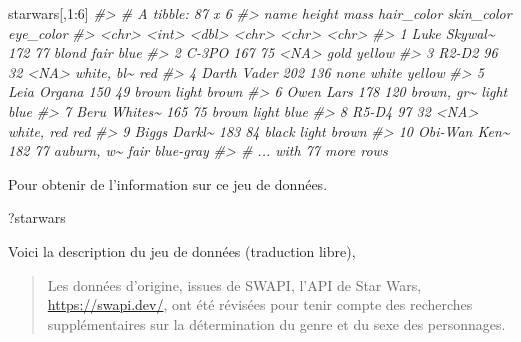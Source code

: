 \documentclass[
]{book}
\newenvironment{Shaded}{}{}
\newcommand{\CommentTok}[1]{\textit{#1}}
\newcommand{\DecValTok}[1]{#1}
\newcommand{\NormalTok}[1]{#1}
\newcommand{\SpecialCharTok}[1]{#1}
\begin{document}
\begin{Shaded}
\begin{Highlighting}[]
\NormalTok{starwars[,}\DecValTok{1}\SpecialCharTok{:}\DecValTok{6}\NormalTok{]}
\CommentTok{\#\textgreater{} \# A tibble: 87 x 6}
\CommentTok{\#\textgreater{}    name         height  mass hair\_color skin\_color eye\_color}
\CommentTok{\#\textgreater{}    \textless{}chr\textgreater{}         \textless{}int\textgreater{} \textless{}dbl\textgreater{} \textless{}chr\textgreater{}      \textless{}chr\textgreater{}      \textless{}chr\textgreater{}    }
\CommentTok{\#\textgreater{}  1 Luke Skywal\textasciitilde{}    172    77 blond      fair       blue     }
\CommentTok{\#\textgreater{}  2 C{-}3PO           167    75 \textless{}NA\textgreater{}       gold       yellow   }
\CommentTok{\#\textgreater{}  3 R2{-}D2            96    32 \textless{}NA\textgreater{}       white, bl\textasciitilde{} red      }
\CommentTok{\#\textgreater{}  4 Darth Vader     202   136 none       white      yellow   }
\CommentTok{\#\textgreater{}  5 Leia Organa     150    49 brown      light      brown    }
\CommentTok{\#\textgreater{}  6 Owen Lars       178   120 brown, gr\textasciitilde{} light      blue     }
\CommentTok{\#\textgreater{}  7 Beru Whites\textasciitilde{}    165    75 brown      light      blue     }
\CommentTok{\#\textgreater{}  8 R5{-}D4            97    32 \textless{}NA\textgreater{}       white, red red      }
\CommentTok{\#\textgreater{}  9 Biggs Darkl\textasciitilde{}    183    84 black      light      brown    }
\CommentTok{\#\textgreater{} 10 Obi{-}Wan Ken\textasciitilde{}    182    77 auburn, w\textasciitilde{} fair       blue{-}gray}
\CommentTok{\#\textgreater{} \# ... with 77 more rows}
\end{Highlighting}
\end{Shaded}

Pour obtenir de l'information sur ce jeu de données.

\begin{Shaded}
\begin{Highlighting}[]
\NormalTok{?starwars}
\end{Highlighting}
\end{Shaded}

Voici la description du jeu de données (traduction libre),

\begin{quote}
Les données d'origine, issues de SWAPI, l'API de Star Wars, \url{https://swapi.dev/}, ont été révisées pour tenir compte des recherches supplémentaires sur la détermination du genre et du sexe des personnages.
\end{quote}
\end{document}
